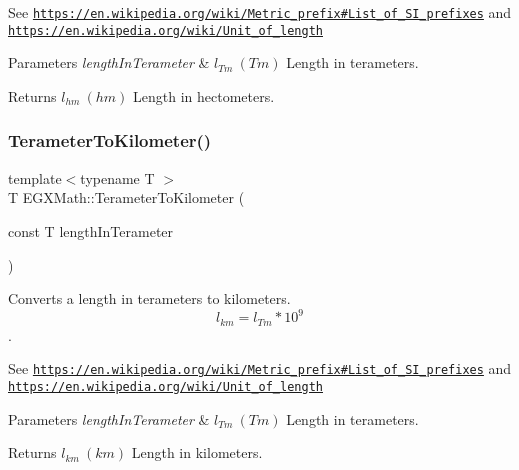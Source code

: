 See \href{https://en.wikipedia.org/wiki/Metric_prefix#List_of_SI_prefixes}{\tt https\+://en.\+wikipedia.\+org/wiki/\+Metric\+\_\+prefix\#\+List\+\_\+of\+\_\+\+S\+I\+\_\+prefixes} and \href{https://en.wikipedia.org/wiki/Unit_of_length}{\tt https\+://en.\+wikipedia.\+org/wiki/\+Unit\+\_\+of\+\_\+length} 
\begin{DoxyParams}{Parameters}
{\em length\+In\+Terameter} & $ l_{Tm}\ (Tm)$ Length in terameters. \\
\hline
\end{DoxyParams}
\begin{DoxyReturn}{Returns}
$ l_{hm}\ (hm)$ Length in hectometers. 
\end{DoxyReturn}
\mbox{\label{group___e_g_x_math-_conversions-_length_conversions-_s_i-_terameter-_s_i_ga3621654052e072519227ad628e03d68b}} 
\subsubsection{\texorpdfstring{Terameter\+To\+Kilometer()}{TerameterToKilometer()}}
{\footnotesize\ttfamily template$<$typename T $>$ \\
T E\+G\+X\+Math\+::\+Terameter\+To\+Kilometer (\begin{DoxyParamCaption}\item[{const T}]{length\+In\+Terameter }\end{DoxyParamCaption})}



Converts a length in terameters to kilometers. \[ l_{km}=l_{Tm} * 10^{9} \]. 

See \href{https://en.wikipedia.org/wiki/Metric_prefix#List_of_SI_prefixes}{\tt https\+://en.\+wikipedia.\+org/wiki/\+Metric\+\_\+prefix\#\+List\+\_\+of\+\_\+\+S\+I\+\_\+prefixes} and \href{https://en.wikipedia.org/wiki/Unit_of_length}{\tt https\+://en.\+wikipedia.\+org/wiki/\+Unit\+\_\+of\+\_\+length} 
\begin{DoxyParams}{Parameters}
{\em length\+In\+Terameter} & $ l_{Tm}\ (Tm)$ Length in terameters. \\
\hline
\end{DoxyParams}
\begin{DoxyReturn}{Returns}
$ l_{km}\ (km)$ Length in kilometers. 
\end{DoxyReturn}
\mbox{\label{group___e_g_x_math-_conversions-_length_conversions-_s_i-_terameter-_s_i_gad4a32011802c13e60cc98081113d52c1}} 
